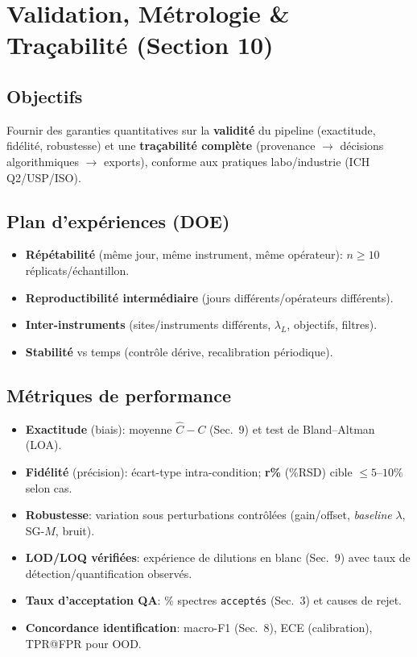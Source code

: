 
\section{Validation, Métrologie \& Traçabilité (Section 10)}

\subsection{Objectifs}
Fournir des garanties quantitatives sur la \textbf{validité} du pipeline (exactitude, fidélité, robustesse) et une \textbf{traçabilité complète} (provenance $\rightarrow$ décisions algorithmiques $\rightarrow$ exports), conforme aux pratiques labo/industrie (ICH Q2/USP/ISO).

\subsection{Plan d'expériences (DOE)}
\begin{itemize}[nosep]
\item \textbf{Répétabilité} (même jour, même instrument, même opérateur): $n\ge 10$ réplicats/échantillon.
\item \textbf{Reproductibilité intermédiaire} (jours différents/opérateurs différents).
\item \textbf{Inter-instruments} (sites/instruments différents, $\lambda_L$, objectifs, filtres).
\item \textbf{Stabilité} vs temps (contrôle dérive, recalibration périodique).
\end{itemize}

\subsection{Métriques de performance}
\begin{itemize}[nosep]
\item \textbf{Exactitude} (biais): moyenne $\hat{C}-C$ (Sec.~9) et test de Bland--Altman (LOA).
\item \textbf{Fidélité} (précision): écart-type intra-condition; \textbf{r\%} (\%RSD) cible $\le 5$--$10\%$ selon cas.
\item \textbf{Robustesse}: variation sous perturbations contrôlées (gain/offset, \emph{baseline} $\lambda$, SG-$M$, bruit).
\item \textbf{LOD/LOQ vérifiées}: expérience de dilutions en blanc (Sec.~9) avec taux de détection/quantification observés.
\item \textbf{Taux d'acceptation QA}: \% spectres \texttt{acceptés} (Sec.~3) et causes de rejet.
\item \textbf{Concordance identification}: macro-F1 (Sec.~8), ECE (calibration), TPR@FPR pour OOD.
\end{itemize}

